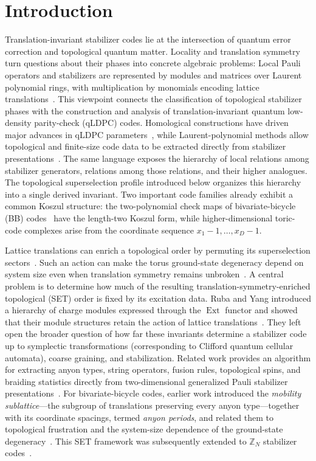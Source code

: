 \documentclass[aps,prx,english,superscriptaddress,twocolumn,tightenlines,showpacs,longbibliography,floatfix,amsfonts]{revtex4-2}
\theoremstyle{remark}
\theoremstyle{definition}
\begin{document}
	\section{Introduction}
	Translation-invariant stabilizer codes lie at the intersection of quantum error
	correction and topological
	quantum matter. Locality and
	translation symmetry turn questions about their phases into concrete algebraic
	problems:
	Local Pauli operators and stabilizers are represented by modules and matrices
	over Laurent polynomial rings, with multiplication by monomials encoding
	lattice translations~\cite{Haah2013}. This viewpoint connects the
	classification of topological stabilizer phases with the construction and
	analysis of translation-invariant quantum low-density parity-check (qLDPC) codes. Homological
	constructions have driven major advances in qLDPC
	parameters~\cite{BreuckmannEberhardt2021,HastingsHaahODonnell2021,
	PanteleevKalachev2022AlmostLinear,PanteleevKalachev2022}, while
	Laurent-polynomial methods
	allow topological and finite-size code data to be extracted directly from
	stabilizer presentations~\cite{Liang2024Extracting,Chen2025PRL,
	Liang2025TwistedTori}. The same language exposes the hierarchy of local
	relations among stabilizer generators, relations among those relations, and
	their higher analogues. The topological superselection profile introduced
	below organizes this hierarchy into a single derived invariant. Two important
	code families already exhibit a common
	Koszul structure: the two-polynomial check maps of bivariate-bicycle (BB)
	codes~\cite{Bravyi2024BB} have the length-two Koszul form, while
	higher-dimensional toric-code complexes
	arise from the coordinate sequence \(x_1-1,\ldots,x_D-1\).

	Lattice translations can enrich a topological order by permuting its
	superselection sectors~\cite{Barkeshli2019}. Such an action can make the torus
	ground-state degeneracy depend on system size even when translation symmetry
	remains unbroken~\cite{Wen2003QuantumOrders,Watanabe2023GSD}. A central
	problem is to determine how much of the resulting
	translation-symmetry-enriched topological (SET) order is fixed by its
	excitation data. Ruba and Yang introduced
	a hierarchy of charge modules expressed through the \(\operatorname{Ext}\)
	functor and showed that their module structures retain the action of lattice
	translations~\cite{Yang2023}. They left open the broader question of how far
	these invariants determine a stabilizer code up to symplectic transformations
	(corresponding to Clifford quantum cellular automata), coarse graining, and
	stabilization. Related work provides an algorithm for extracting anyon types,
	string operators, fusion rules, topological spins, and braiding statistics
	directly from two-dimensional generalized Pauli stabilizer
	presentations~\cite{Liang2024Extracting}. For bivariate-bicycle codes, earlier
	work introduced the \emph{mobility sublattice}---the subgroup of translations
	preserving every anyon type---together with its coordinate spacings, termed
	\emph{anyon periods}, and related them to topological frustration and the
	system-size dependence of the ground-state
	degeneracy~\cite{Chen2025PRL}. This SET framework was subsequently extended
	to \(\mathbb Z_N\) stabilizer codes~\cite{He2026PRB}.
\end{document}
